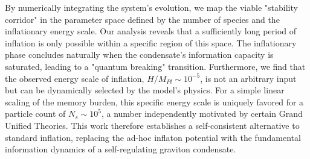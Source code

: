 \documentclass[]{article}
\begin{document}
By numerically integrating the system's evolution, we map the viable "stability corridor" in the parameter space defined by the number of species and the inflationary energy scale. Our analysis reveals that a sufficiently long period of inflation is only possible within a specific region of this space. The inflationary phase concludes naturally when the condensate's information capacity is saturated, leading to a "quantum breaking" transition. Furthermore, we find that the observed energy scale of inflation, $H/M_{Pl} \sim 10^{-5}$, is not an arbitrary input but can be dynamically selected by the model's physics. For a simple linear scaling of the memory burden, this specific energy scale is uniquely favored for a particle count of $N_s \sim 10^5$, a number independently motivated by certain Grand Unified Theories. This work therefore establishes a self-consistent alternative to standard inflation, replacing the ad-hoc inflaton potential with the fundamental information dynamics of a self-regulating graviton condensate.
\end{document}
